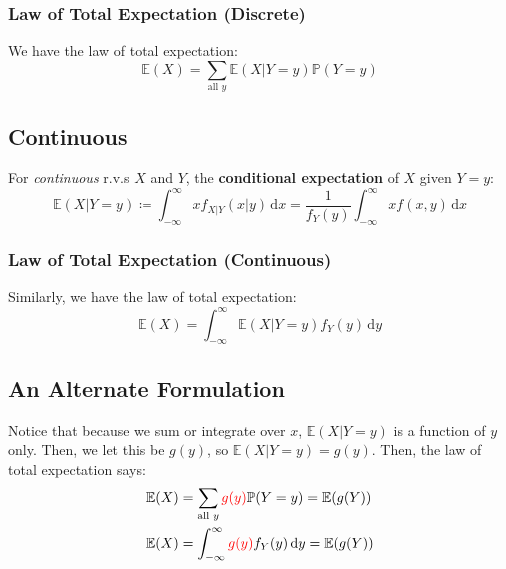 \documentclass{article}
\begin{document}
\subsubsection{Law of Total Expectation (Discrete)}

\begin{definition}
    We have the law of total expectation: \begin{equation}
        \mathbb{E}(X) = \sum_{\text{all } y} \mathbb{E}(X | Y = y) \mathbb{P}(Y = y) 
    \end{equation}
\end{definition}

\subsection{Continuous}

\begin{definition}
    For \textit{continuous} r.v.s $X$ and $Y$, the \textbf{conditional expectation} of $X$ given $Y = y$: \begin{equation}
        \mathbb{E}(X | Y = y) \coloneq \int_{-\infty}^{\infty} x f_{X | Y} (x | y) \, \mathrm{d}x = \frac{1}{f_Y (y)} \int_{-\infty}^{\infty} xf(x,y) \, \mathrm{d}x
    \end{equation}
\end{definition}

\subsubsection{Law of Total Expectation (Continuous)}

\begin{definition}
    Similarly, we have the law of total expectation: \begin{equation}
        \mathbb{E}(X) = \int_{-\infty}^{\infty} \mathbb{E}(X | Y = y) f_Y (y) \, \mathrm{d}y 
    \end{equation}
\end{definition}

\subsection{An Alternate Formulation}

Notice that because we sum or integrate over $x$, $\mathbb{E}(X | Y = y)$ is a function of $y$ only. Then, we let this be $g(y)$, so $\mathbb{E}(X | Y = y) = g(y)$. Then, the law of total expectation says: \begin{align}
    \mathbb{E}(X) &= \sum_{\text{all } y} \textcolor{red}{g(y)} \mathbb{P}(Y = y) = \mathbb{E}(g(Y)) \\ 
    \mathbb{E}(X) &= \int_{-\infty}^{\infty} \textcolor{red}{g(y)} f_Y (y) \, \mathrm{d} y = \mathbb{E}(g(Y))
\end{align}
\end{document}

